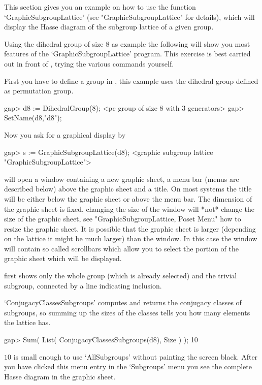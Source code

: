 
This  section   gives  you an   example    on how  to    use the function
`GraphicSubgroupLattice' (see "GraphicSubgroupLattice" for  details), which 
will  display the Hasse diagram of the subgroup lattice of a given group.

Using the dihedral group of size $8$ as example the following will show you
most features of the `GraphicSubgroupLattice' program.  This exercise is
best carried out in front of {\XGAP}, trying the various commands yourself.

First  you   have to define a  group   in {\GAP},  this example  uses the
dihedral group defined as permutation group.

\begintt
gap> d8 := DihedralGroup(8);
<pc group of size 8 with 3 generators>
gap> SetName(d8,"d8");
\endtt

Now you ask for a graphical display by

\begintt
gap> s := GraphicSubgroupLattice(d8);
<graphic subgroup lattice "GraphicSubgroupLattice">
\endtt

{\XGAP} will open a window containing a new graphic sheet, a menu bar
(menus are described below) above the graphic sheet and a title.  On most
systems the title will be either below the graphic sheet or above the menu
bar.  The dimension of the graphic sheet is fixed, changing the size of the
window will *not* change the size of the graphic sheet, see
"GraphicSubgroupLattice, Poset Menu" how to resize the graphic sheet.  It
is possible that the graphic sheet is larger (depending on the lattice it
might be much larger) than the window.  In this case the window will
contain so called scrollbars which allow you to select the portion of the
graphic sheet which will be displayed. 

{\XGAP} first shows only the whole group (which is already selected) and
the trivial subgroup, connected by a line indicating inclusion. 

`ConjugacyClassesSubgroups' computes and returns the conjugacy classes of
subgroups, so summing  up the sizes  of the classes   tells you how  many
elements the lattice has.

\begintt
    gap> Sum( List( ConjugacyClassesSubgroups(d8), Size ) );
    10 
\endtt

$10$ is small enough to use `AllSubgroups' without painting the screen
black.  After you have clicked this menu entry in the `Subgroups' menu you
see the complete Hasse diagram in the graphic sheet.

